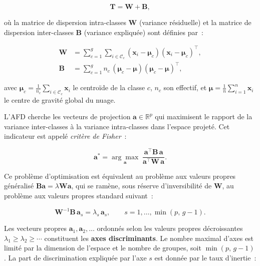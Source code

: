 \documentclass[12pt, a4paper, oneside]{report}
\begin{document}
	\begin{equation}
		\mathbf{T} = \mathbf{W} + \mathbf{B},
		\label{eq:decomp_variance}
	\end{equation}
	
	où la matrice de dispersion intra-classes $\mathbf{W}$ (variance résiduelle) et la matrice de dispersion inter-classes $\mathbf{B}$ (variance expliquée) sont définies par~:
	
	\begin{align}
		\mathbf{W} &= \sum_{c=1}^{g} \sum_{i \in \mathcal{C}_c} \left(\mathbf{x}_i - \boldsymbol{\mu}_c\right) \left(\mathbf{x}_i - \boldsymbol{\mu}_c\right)^{\top}, \label{eq:W} \\[6pt]
		\mathbf{B} &= \sum_{c=1}^{g} n_c\,\left(\boldsymbol{\mu}_c - \boldsymbol{\mu}\right) \left(\boldsymbol{\mu}_c - \boldsymbol{\mu}\right)^{\top}, \label{eq:B}
	\end{align}
	
	avec $\boldsymbol{\mu}_c = \frac{1}{n_c}\sum_{i \in \mathcal{C}_c} \mathbf{x}_i$ le centroïde de la classe $c$, $n_c$ son effectif, et $\boldsymbol{\mu} = \frac{1}{n}\sum_{i=1}^{n} \mathbf{x}_i$ le centre de gravité global du nuage.
	
	L'AFD cherche les vecteurs de projection $\mathbf{a} \in \mathbb{R}^p$ qui maximisent le rapport de la variance inter-classes à la variance intra-classes dans l'espace projeté. Cet indicateur est appelé \textit{critère de Fisher}~:
	
	\begin{equation}
		\mathbf{a}^* = \underset{\mathbf{a}}{\arg\max}\; \frac{\mathbf{a}^{\top}\mathbf{B}\,\mathbf{a}}{\mathbf{a}^{\top}\mathbf{W}\,\mathbf{a}}.
		\label{eq:fisher}
	\end{equation}
	
	Ce problème d'optimisation est équivalent au problème aux valeurs propres généralisé $\mathbf{B}\mathbf{a} = \lambda\mathbf{W}\mathbf{a}$, qui se ramène, sous réserve d'inversibilité de $\mathbf{W}$, au problème aux valeurs propres standard suivant~:
	
	\begin{equation}
		\mathbf{W}^{-1}\mathbf{B}\,\mathbf{a}_s = \lambda_s\,\mathbf{a}_s, \qquad s = 1, \ldots, \min(p,\, g-1).
		\label{eq:vp_standard}
	\end{equation}
	
	Les vecteurs propres $\mathbf{a}_1, \mathbf{a}_2, \ldots$ ordonnés selon les valeurs propres décroissantes $\lambda_1 \geq \lambda_2 \geq \cdots$ constituent les \textbf{axes discriminants}. Le nombre maximal d'axes est limité par la dimension de l'espace et le nombre de groupes, soit $\min(p,\, g-1)$. La part de discrimination expliquée par l'axe $s$ est donnée par le taux d'inertie~:
	
\end{document}
